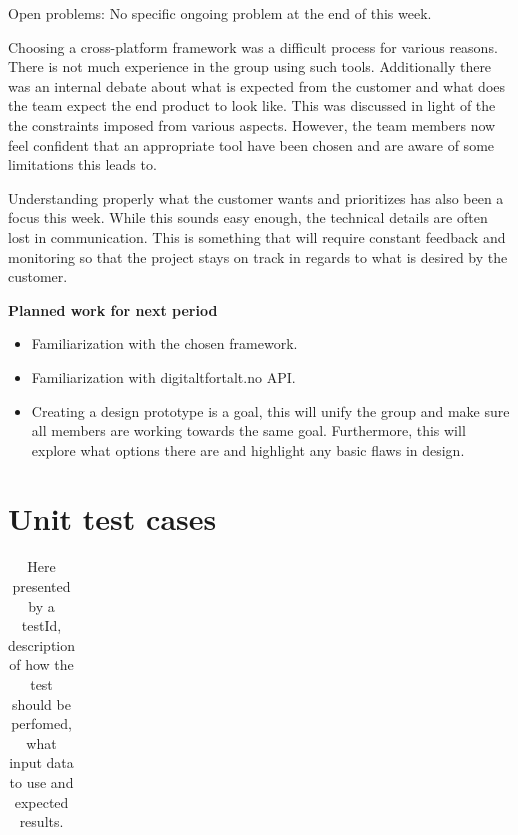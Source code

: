 \begin{appendices}
		Open problems:\newline
		No specific ongoing problem at the end of this week.\newline
		
		Choosing a cross-platform framework was a difficult process for various reasons. There is not much experience in the group using such tools. Additionally there was an internal debate about what is expected from the customer and what does the team expect the end product to look like. This was discussed in light of the the constraints imposed from various aspects. However, the team members now feel confident that an appropriate tool have been chosen and are aware of some limitations this leads to.\newline
		
		Understanding properly what the customer wants and prioritizes has also been a focus this week. While this sounds easy enough, the technical details are often lost in communication. This is something that will require constant feedback and monitoring so that the project stays on track in regards to what is desired by the customer.\newline
		
		\textbf{Planned work for next period}\newline
		\begin{itemize}
			\item Familiarization with the chosen framework.
			\item Familiarization with digitaltfortalt.no API.
			\item Creating a design prototype is a goal, this will unify the group and make sure all members are working towards the same goal. Furthermore, this will explore what options there are and highlight any basic flaws in design.
		\end{itemize}
\raggedbottom
\newpage		

\chapter{Unit test cases}
\label{app:unittest}
\renewcommand{\arraystretch}{2}%
\begin{center}
	\begin{longtable}{ | p{1cm} | p{5.5cm} | p{4cm} | p{4.5cm} | p{2cm}|}
		\caption[Unit Test cases]{ Here presented by a testId, description of how the test should be perfomed, what input data to use and expected results.} \label{Tab:unittestcases}\\
		

\end{longtable}
\end{center}
\end{appendices}
